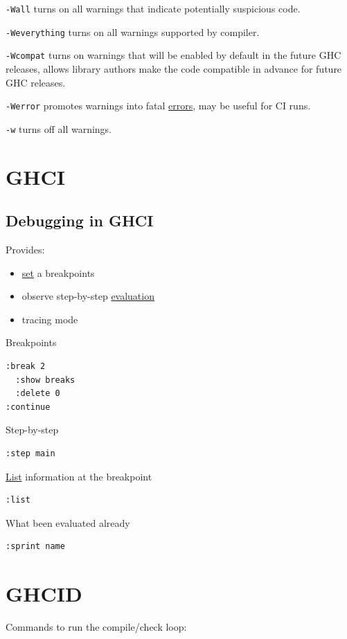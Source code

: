 \documentclass[a4paper,14pt,oneside]{book}
\begin{document}
\texttt{-Wall} turns on all warnings that indicate potentially suspicious code.

\texttt{-Weverything} turns on all warnings supported by compiler.

\texttt{-Wcompat} turns on warnings that will be enabled by default in the future GHC releases, allows library authors make the code compatible in advance for future GHC releases.

\texttt{-Werror} promotes warnings into fatal \hyperref[org7b329da]{errors}, may be useful for CI runs.

\texttt{-w} turns off all warnings.

\chapter{GHCI}
\label{sec:org1464bca}
\section{Debugging in GHCI}
\label{sec:orgd93bd3c}

Provides:
\begin{itemize}
\item \hyperref[org1f3ff57]{set} a breakpoints
\item observe step-by-step \hyperref[orgbce07c8]{evaluation}
\item tracing mode
\end{itemize}

Breakpoints
\begin{verbatim}
:break 2
  :show breaks
  :delete 0
:continue
\end{verbatim}

Step-by-step
\begin{verbatim}
:step main
\end{verbatim}

\hyperref[org3595c2b]{List} information at the breakpoint
\begin{verbatim}
:list
\end{verbatim}

What been evaluated already
\begin{verbatim}
:sprint name
\end{verbatim}

\chapter{GHCID}
\label{sec:org03a20dc}

Commands to run the compile/check loop:
\end{document}
